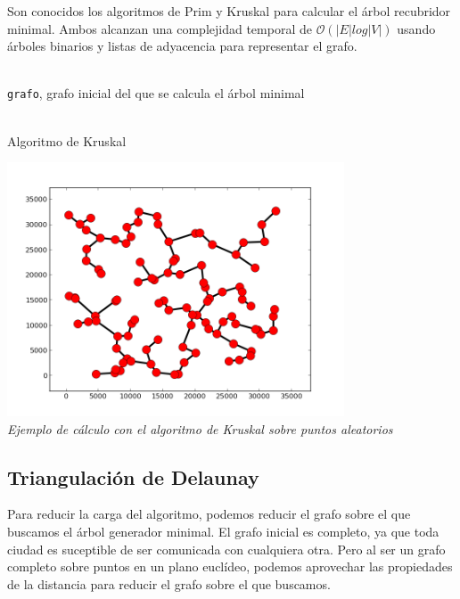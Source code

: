 \documentclass[a4paper, 11pt]{article} %
\let\emptyset\varnothing
\begin{document}
    Son conocidos los algoritmos de Prim y Kruskal para calcular el árbol recubridor minimal. Ambos alcanzan una
    complejidad temporal de $\mathcal{O}(|E|log|V|)$ usando árboles binarios y listas de adyacencia para
    representar el grafo.
    
    \begin{algorithm}[H]
	\begin{algorithmic}[1]
		\REQUIRE \ \\
        	\texttt{grafo}, grafo inicial del que se calcula el árbol minimal \\\
		\STATE{\texttt{árbol=}$\emptyset$}
		\ENDFOR
		    \ENDIF
		\ENDFOR
	\end{algorithmic}
      \caption{Algoritmo de Kruskal}
      \label{kruskal}
    \end{algorithm}

    \begin{center}
	\includegraphics[width=10cm]{figure_1.png} \\
	\textit{Ejemplo de cálculo con el algoritmo de Kruskal sobre puntos aleatorios}
     \end{center}  
    
  \subsection{Triangulación de Delaunay}
    Para reducir la carga del algoritmo, podemos reducir el grafo sobre el que buscamos el árbol generador minimal.
    El grafo inicial es completo, ya que toda ciudad es suceptible de ser comunicada con cualquiera otra. Pero al 
    ser un grafo completo sobre puntos en un plano euclídeo, podemos aprovechar las propiedades de la distancia para
    reducir el grafo sobre el que buscamos.
    
\end{document}
